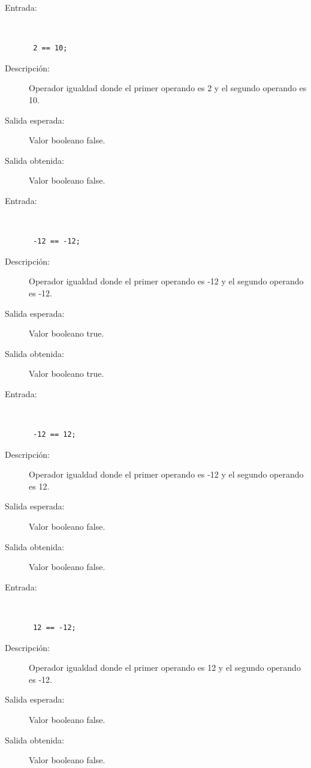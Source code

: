 \begin{framed}
	\begin{description}
		\item [Entrada:] \hfill \\
\begin{lstlisting}
 2 == 10;
\end{lstlisting}
		\item [Descripción:] Operador igualdad donde el primer operando es 2 y el segundo operando es  10.
		\item [Salida esperada:] Valor booleano false.
		\item [Salida obtenida:] Valor booleano false.
	\end{description}
\end{framed}

\begin{framed}
	\begin{description}
		\item [Entrada:] \hfill \\
\begin{lstlisting}
 -12 == -12;
\end{lstlisting}
		\item [Descripción:] Operador igualdad donde el primer operando es -12 y el segundo operando es  -12.
		\item [Salida esperada:] Valor booleano true.
		\item [Salida obtenida:] Valor booleano true.
	\end{description}
\end{framed}

\begin{framed}
	\begin{description}
		\item [Entrada:] \hfill \\
\begin{lstlisting}
 -12 == 12;
\end{lstlisting}
		\item [Descripción:] Operador igualdad donde el primer operando es -12 y el segundo operando es  12.
		\item [Salida esperada:] Valor booleano false.
		\item [Salida obtenida:] Valor booleano false.
	\end{description}
\end{framed}

\begin{framed}
	\begin{description}
		\item [Entrada:] \hfill \\
\begin{lstlisting}
 12 == -12;
\end{lstlisting}
		\item [Descripción:] Operador igualdad donde el primer operando es 12 y el segundo operando es  -12.
		\item [Salida esperada:] Valor booleano false.
		\item [Salida obtenida:] Valor booleano false.
	\end{description}
\end{framed}

